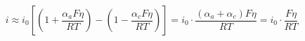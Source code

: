 \documentclass[preview]{standalone}
\begin{document}
\[i \approx i_0 \left[\left(1 + \frac{\alpha_a F\eta}{RT}\right) - \left(1 - \frac{\alpha_c F\eta}{RT}\right)\right] = i_0 \cdot \frac{(\alpha_a + \alpha_c) F\eta}{RT} = i_0 \cdot \frac{F\eta}{RT}\]
\end{document}
